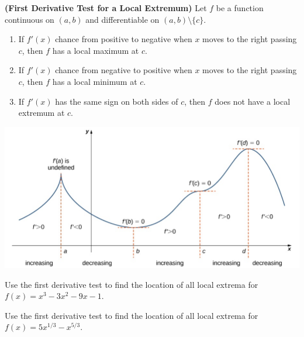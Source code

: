 \begin{proposition}

\textbf{(First Derivative Test for a Local Extremum)} Let \(f\) be a
function continuous on \((a, b)\) and differentiable on
\((a, b)\setminus\{c\}\).

\begin{enumerate}[sepno]
\item
  If \(f'(x)\) chance from positive to negative when \(x\) moves to the
  right passing \(c\), then \(f\) has a local maximum at \(c\).
\item
  If \(f'(x)\) chance from negative to positive when \(x\) moves to the
  right passing \(c\), then \(f\) has a local minimum at \(c\).
\item
  If \(f'(x)\) has the same sign on both sides of \(c\), then \(f\) does
  not have a local extremum at \(c\).
\end{enumerate}

\begin{fullwidth}
  \centering
  \includegraphics[width=0.8\linewidth]{img/image-20200413134520221.png}
\end{fullwidth}

\end{proposition}

\begin{example}

Use the first derivative test to find the location of all local extrema
for \(f(x)=x^3 - 3x^2 - 9x - 1\).

\end{example}
\vspace*{6\baselineskip}

\begin{example}

Use the first derivative test to find the location of all local extrema
for \(f(x)=5x^{1/3} - x^{5/3}\).

\end{example}
\vspace*{6\baselineskip}

